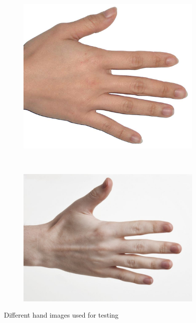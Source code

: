 \documentclass[12pt, a4paper]{article}
\begin{document}
\begin{figure}[H]
\begin{subfigure}[b]{0.20\textwidth}
        \includegraphics[width=\textwidth]{images/hand_light}
        \caption{}\label{img:input_hands_1_light}
    \end{subfigure}
    ~
    \begin{subfigure}[b]{0.20\textwidth}
        \includegraphics[width=\textwidth]{images/hand_pale}
        \caption{}\label{img:input_hands_1_pale}
    \end{subfigure}
    \caption{Different hand images used for testing}\label{img:input_hands_1}
\end{figure}
\end{document}
